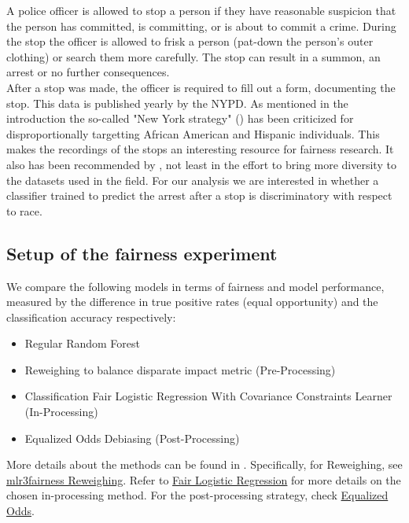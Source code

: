 A police officer is allowed to stop a person if they have reasonable suspicion that the person has committed, is committing, or is about to commit a crime.
During the stop the officer is allowed to frisk a person (pat-down the person's outer clothing) or search them more carefully.
The stop can result in a summon, an arrest or no further consequences.\\
After a stop was made, the officer is required to fill out a form, documenting the stop. This data is published yearly by the NYPD.
As mentioned in the introduction the so-called "New York strategy" (\cite{gelman2007}) has been criticized for disproportionally targetting African American and Hispanic individuals. This makes the recordings of the stops an interesting resource for fairness research.
It also has been recommended by \cite{Fabris_2022}, not least in the effort to bring more diversity to the datasets used in the field.
For our analysis we are interested in whether a classifier trained to predict the arrest after a stop is discriminatory with respect to race.


\subsection{Setup of the fairness experiment}
We compare the following models in terms of fairness and model performance, measured by the difference in true positive rates (equal opportunity)  and the classification accuracy respectively:
\begin{itemize}
    \item Regular Random Forest
    \item Reweighing to balance disparate impact metric (Pre-Processing)
    \item Classification Fair Logistic Regression With Covariance Constraints Learner (In-Processing)
    \item Equalized Odds Debiasing (Post-Processing)
\end{itemize}
More details about the methods can be found in \cite{mlr3_book}.  
Specifically, for Reweighing, see \href{https://mlr3fairness.mlr-org.com/reference/mlr_pipeops_reweighing.html}{mlr3fairness Reweighing}.  
Refer to \href{https://rdrr.io/cran/mlr3fairness/man/mlr_learners_classif.fairzlrm.html}{Fair Logistic Regression} for more details on the chosen in-processing method.  
For the post-processing strategy, check \href{https://mlr3fairness.mlr-org.com/reference/mlr_pipeops_equalized_odds.html}{Equalized Odds}.  

